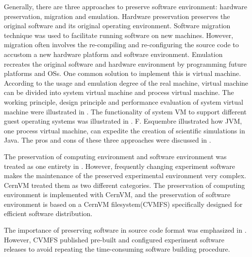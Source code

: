 \documentclass{acm_proc_article-sp}
\begin{document}
Generally, there are three approaches to preserve software environment:
hardware preservation, migration and emulation.  Hardware
preservation preserves the original software and its original operating
environment. 
Software migration technique \cite{cifuentes1996binary,mancl2001refactoring} was used to facilitate running software on new machines.
However, migration often involves the re-compiling and re-configuring
the source code to accustom a new hardware platform and software environment.
Emulation recreates the original software and hardware environment by
programming future platforms and OSs. One common solution to implement this is
virtual machine. According to the usage and emulation degree of the real
machine, virtual machine can be divided into system virtual machine and process
virtual machine. 
The working principle, design principle and
performance evaluation of system virtual machine were illustrated in \cite{goldberg1974survey, smith2005architecture}. 
The
functionality of system VM to support different guest operating systems was illustrated in \cite{barham2003xen,kivity2007kvm,rosenblum1999vmware}.
F. Esquembre \cite{esquembre2004easy} illustrated how JVM, one process virtual machine, can expedite the creation of
scientific simulations in Java. 
The pros and cons of these three approaches were discussed in \cite{matthews2009towards,phelps2005no,hong2010software}.

The preservation of computing environment and software environment was treated as one entirety in \cite{matthews2009towards,phelps2005no,hong2010software}. However, frequently changing experiment software makes the maintenance of the preserved experimental environment very complex. 
CernVM \cite{buncic2010cernvm} treated them as two different categories. The preservation of computing environment is implemented with CernVM, and the preservation of software environment is based on a CernVM filesystem(CVMFS) specifically designed for efficient software distribution.

The importance of preserving software in source code format was emphasized in \cite{zabolitzky2002preserving,castagne2013consider}. 
However, CVMFS \cite{buncic2010cernvm} published pre-built and configured experiment software releases to avoid repeating the time-consuming software building procedure. 
\end{document}
